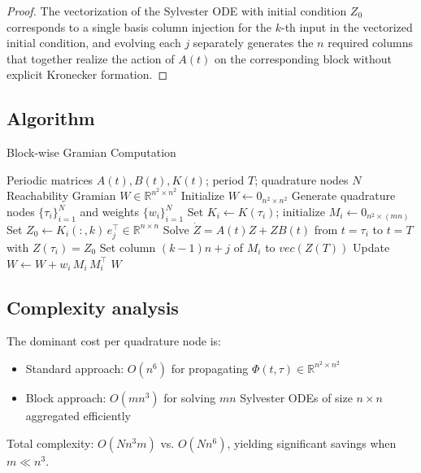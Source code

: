 \documentclass[5p,times]{elsarticle} %
\def\Acal{A}%
\def\vect{vec}%
\newcommand{\vect}{\mathrm{vec}}
\newcommand{\Acal}{\mathcal{A}}
\begin{document}
\begin{proof}
The vectorization of the Sylvester ODE with initial condition \(Z_0\) corresponds to a single basis column injection for the \(k\)-th input in the vectorized initial condition, and evolving each \(j\) separately generates the \(n\) required columns that together realize the action of \(\Acal(t)\) on the corresponding block without explicit Kronecker formation.
\end{proof}

\subsection{Algorithm}
\begin{algorithm}
\caption{Block-wise Gramian Computation}
\label{alg:gramian}
\begin{algorithmic}[1]
\REQUIRE Periodic matrices \(A(t), B(t), K(t)\); period \(T\); quadrature nodes \(N\)
\ENSURE Reachability Gramian \(W\in\mathbb{R}^{n^2\times n^2}\)
\STATE Initialize \(W\leftarrow 0_{n^2\times n^2}\)
\STATE Generate quadrature nodes \(\{\tau_i\}_{i=1}^N\) and weights \(\{w_i\}_{i=1}^N\)
  \STATE Set \(K_i \leftarrow K(\tau_i)\); initialize \(M_i \leftarrow 0_{n^2\times (mn)}\)
      \STATE Set \(Z_0 \leftarrow K_i(:,k)\, e_j^\top \in \mathbb{R}^{n\times n}\)
      \STATE Solve \(\dot Z = A(t)Z + ZB(t)\) from \(t=\tau_i\) to \(t=T\) with \(Z(\tau_i)=Z_0\)
      \STATE Set column \((k-1)n + j\) of \(M_i\) to \(\vect(Z(T))\)
    \ENDFOR
  \ENDFOR
  \STATE Update \(W \leftarrow W + w_i\, M_i\, M_i^\top\)
\ENDFOR
\RETURN \(W\)
\end{algorithmic}
\end{algorithm}

\subsection{Complexity analysis}
The dominant cost per quadrature node is:
\begin{itemize}
\item Standard approach: \(O(n^6)\) for propagating \(\Phi(t,\tau)\in\mathbb{R}^{n^2\times n^2}\)
\item Block approach: \(O(mn^3)\) for solving \(mn\) Sylvester ODEs of size \(n\times n\) aggregated efficiently
\end{itemize}
Total complexity: \(O(Nn^3m)\) vs. \(O(Nn^6)\), yielding significant savings when \(m\ll n^3\).
\end{document}
